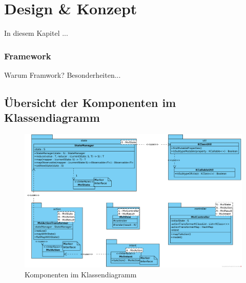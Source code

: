 \section{Design \& Konzept}
\label{sec:design-und-konzept}
In diesem Kapitel ...

\subsubsection{Framework}
Warum Framwork? Besonderheiten...
\subsection{Übersicht der Komponenten im Klassendiagramm}
\begin{figure}
		\includegraphics[width=\textwidth]{./images/framework-class-diagram}
		\caption{Komponenten im Klassendiagramm}
\end{figure}
\clearpage
